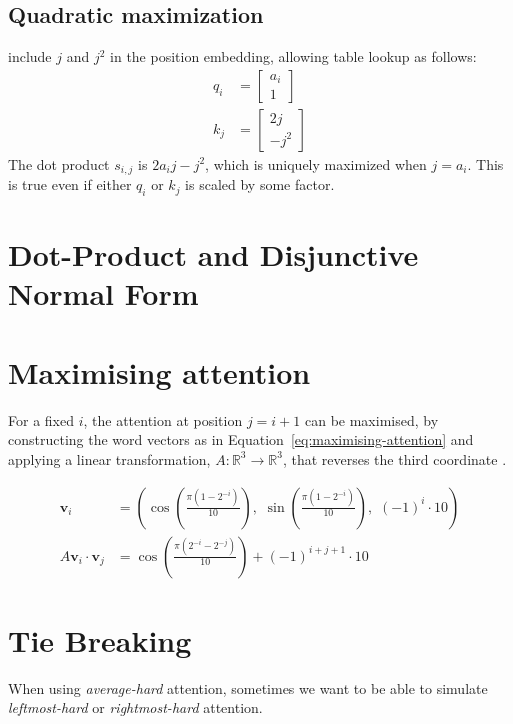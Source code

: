 \subsection{Quadratic maximization}

 include $j$ and $j^2$ in the position embedding, allowing table lookup as follows:
\begin{align*}
  q_i &= \begin{bmatrix} a_i \\ 1 \end{bmatrix} \\
  k_j &= \begin{bmatrix} 2j \\ -j^2 \end{bmatrix}
\end{align*}
The dot product $s_{i,j}$ is $2a_ij - j^2$, which is uniquely maximized when $j=a_i$.
This is true even if either $q_i$ or $k_j$ is scaled by some factor.

\iffalse
\subsection{$-|\text{Dot-product}|$ attention}

\citep{perez-etal-2021-turing}
\fi

\section{Dot-Product and Disjunctive Normal Form}
\label{sec:att_dnf}

\section{Maximising attention}

For a fixed $i$, the attention at position $j = i + 1$ can be maximised, by
constructing the word vectors as in Equation~\ref{eq:maximising-attention} and applying a linear transformation, $A \colon \mathbb{R}^3 \to \mathbb{R}^3$, that reverses the third coordinate \citep{barcelo-etal-2024-logical}.

\begin{align}
    \label{eq:maximising-attention}
    \mathbf{v}_i &= \left(\cos\left(\frac{\pi(1 - 2^{-i})}{10}\right), \,\, \sin\left(\frac{\pi(1 - 2^{-i})}{10}\right), \,\,(-1)^i\cdot 10 \right)\\
    A\mathbf{v}_i \cdot \mathbf{v}_j &=\cos\left(\frac{\pi(2^{-i}-2^{-j})}{10}\right) + (-1)^{i + j + 1}\cdot 10
\end{align}

\section{Tie Breaking}

When using \emph{average-hard} attention, sometimes we want to be able to simulate \emph{leftmost-hard} or \emph{rightmost-hard} attention.
